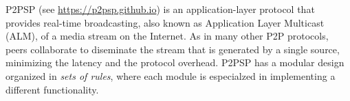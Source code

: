 P2PSP (see \url{https://p2psp.github.io}) is an application-layer
protocol that provides real-time broadcasting, also known as
Application Layer Multicast (ALM), of a media stream on the
Internet. As in many other P2P protocols, peers collaborate to
diseminate the stream that is generated by a single source, minimizing
the latency and the protocol overhead. P2PSP has a modular design
organized in \emph{sets of rules}, where each module is especialzed in
implementing a different functionality.
